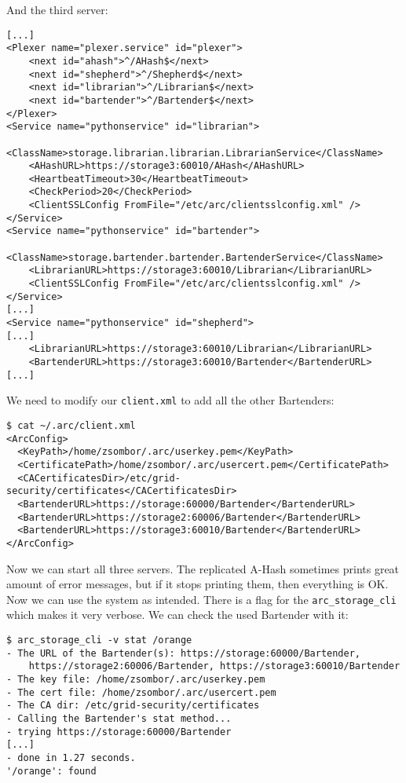 \documentclass{book}
\begin{document}
And the third server:

\begin{verbatim}
[...]
<Plexer name="plexer.service" id="plexer">
    <next id="ahash">^/AHash$</next>
    <next id="shepherd">^/Shepherd$</next>
    <next id="librarian">^/Librarian$</next>
    <next id="bartender">^/Bartender$</next>
</Plexer>
<Service name="pythonservice" id="librarian">
    <ClassName>storage.librarian.librarian.LibrarianService</ClassName>
    <AHashURL>https://storage3:60010/AHash</AHashURL>
    <HeartbeatTimeout>30</HeartbeatTimeout>
    <CheckPeriod>20</CheckPeriod>
    <ClientSSLConfig FromFile="/etc/arc/clientsslconfig.xml" />
</Service>
<Service name="pythonservice" id="bartender">
    <ClassName>storage.bartender.bartender.BartenderService</ClassName>
    <LibrarianURL>https://storage3:60010/Librarian</LibrarianURL>
    <ClientSSLConfig FromFile="/etc/arc/clientsslconfig.xml" />
</Service>
[...]
<Service name="pythonservice" id="shepherd">
[...]
    <LibrarianURL>https://storage3:60010/Librarian</LibrarianURL>
    <BartenderURL>https://storage3:60010/Bartender</BartenderURL>
[...]
\end{verbatim}

We need to modify our \verb!client.xml! to add all the other Bartenders:

\begin{verbatim}
$ cat ~/.arc/client.xml 
<ArcConfig>
  <KeyPath>/home/zsombor/.arc/userkey.pem</KeyPath>
  <CertificatePath>/home/zsombor/.arc/usercert.pem</CertificatePath>
  <CACertificatesDir>/etc/grid-security/certificates</CACertificatesDir>
  <BartenderURL>https://storage:60000/Bartender</BartenderURL>
  <BartenderURL>https://storage2:60006/Bartender</BartenderURL>
  <BartenderURL>https://storage3:60010/Bartender</BartenderURL>
</ArcConfig>
\end{verbatim}

Now we can start all three servers. The replicated A-Hash sometimes prints great amount of error messages, but if it stops printing them, then everything is OK. Now we can use the system as intended. There is a flag for the \verb!arc_storage_cli! which makes it very verbose. We can check the used Bartender with it:

\begin{verbatim}
$ arc_storage_cli -v stat /orange
- The URL of the Bartender(s): https://storage:60000/Bartender,
    https://storage2:60006/Bartender, https://storage3:60010/Bartender
- The key file: /home/zsombor/.arc/userkey.pem
- The cert file: /home/zsombor/.arc/usercert.pem
- The CA dir: /etc/grid-security/certificates
- Calling the Bartender's stat method...
- trying https://storage:60000/Bartender
[...]
- done in 1.27 seconds.
'/orange': found
\end{verbatim}
\end{document}
